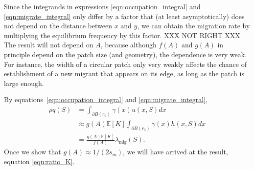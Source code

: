 \documentclass{article}
\newcommand{\E}{\mathbb{E}}
\newcommand{\migrate}{\lambda_\text{mig}}
\begin{document}
Since the integrands in expressions \eqref{eqn:occupation_integral} and \eqref{eqn:migrate_integral} only differ by a factor
that (at least asymptotically) does not depend on the distance between $x$ and $y$,
we can obtain the migration rate by multiplying the equilibrium frequency by this factor.
XXX NOT RIGHT XXX
The result will not depend on $A$, 
because although $f(A)$ and $g(A)$ in principle depend on the patch size (and geometry),
the dependence is very weak.
For instance, the width of a circular patch only very weakly affects the chance 
of establishment of a new migrant that appears on its edge,
as long as the patch is large enough.

By equations~\eqref{eqn:occupation_integral} and \eqref{eqn:migrate_integral},
\begin{align}
    \rho q(S)  &= \int_{\partial B(r_0)} \gamma(x) u(x,S) dx  \\
          &\approx g(A) \E[K] \int_{\partial B(r_0)} \gamma(x) h(x,S) dx \\
          &= \frac{ g(A) \E[K] }{ f(A) } \migrate(S) . \label{eqn:q_migrate_relation}
\end{align}
Once we show that $g(A) \approx 1/(2 s_m)$, 
we will have arrived at the result, equation \eqref{eqn:ratio_K}.
\end{document}
